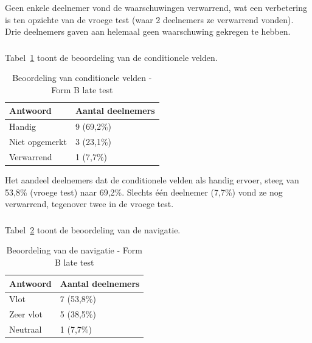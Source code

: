 Geen enkele deelnemer vond de waarschuwingen verwarrend, wat een verbetering is ten opzichte van de vroege test (waar 2 deelnemers ze verwarrend vonden). Drie deelnemers gaven aan helemaal geen waarschuwing gekregen te hebben.

\subsubsection{}

Tabel~\ref{tab:laat-formb-conditioneel} toont de beoordeling van de conditionele velden.

\begin{table}[h]
  \centering
  \caption[Beoordeling conditionele velden late test Form B]{Beoordeling van conditionele velden - Form B late test}
  \label{tab:laat-formb-conditioneel}
  \begin{tabular}{ll}
    \hline
    \textbf{Antwoord} & \textbf{Aantal deelnemers} \\
    \hline
    Handig         & 9 (69,2\%) \\
    Niet opgemerkt & 3 (23,1\%) \\
    Verwarrend     & 1 (7,7\%)  \\
    \hline
  \end{tabular}
\end{table}

Het aandeel deelnemers dat de conditionele velden als handig ervoer, steeg van 53,8\% (vroege test) naar 69,2\%. Slechts één deelnemer (7,7\%) vond ze nog verwarrend, tegenover twee in de vroege test.

\subsubsection{}

Tabel~\ref{tab:laat-formb-navigatie} toont de beoordeling van de navigatie.

\begin{table}[h]
  \centering
  \caption[Beoordeling navigatie late test Form B]{Beoordeling van de navigatie - Form B late test}
  \label{tab:laat-formb-navigatie}
  \begin{tabular}{ll}
    \hline
    \textbf{Antwoord} & \textbf{Aantal deelnemers} \\
    \hline
    Vlot      & 7 (53,8\%) \\
    Zeer vlot & 5 (38,5\%) \\
    Neutraal  & 1 (7,7\%)  \\
    \hline
  \end{tabular}
\end{table}

